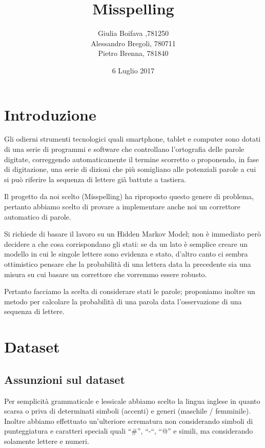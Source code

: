 \documentclass[a4paper,11pt]{article}
\title{Misspelling}
\author{Giulia Boifava ,781250\\
        Alessandro Bregoli, 780711\\
        Pietro Brenna, 781840}
\date{6 Luglio 2017}
\begin{document}
\maketitle
\newpage
\tableofcontents
\newpage

\section{Introduzione}
  Gli odierni strumenti tecnologici quali smartphone, tablet e computer sono dotati di una serie di programmi e software che controllano
  l’ortografia delle parole digitate, correggendo automaticamente il termine scorretto o proponendo, in fase di digitazione, una serie di
  dizioni che più somigliano alle potenziali parole a cui si può riferire la sequenza di lettere già battute a tastiera.
  
  Il progetto da noi scelto (Misspelling) ha riproposto questo genere di problema, pertanto abbiamo scelto di provare a implementare 
  anche noi un correttore automatico di parole.
  
  Si richiede di basare il lavoro su un Hidden Markov Model; non è immediato però decidere a che cosa corrispondano gli stati: se da un lato è 
  semplice creare un modello in cui le singole lettere sono evidenza e stato, d'altro canto ci sembra ottimistico pensare che la probabilità 
  di una lettera data la precedente sia una misura su cui basare un correttore che vorremmo essere robusto.
  
  Pertanto facciamo la scelta di considerare stati le parole; proponiamo inoltre un metodo per calcolare la probabilità di una parola data l'osservazione 
  di una sequenza di lettere.
\newpage
\section{Dataset}
  \subsection{Assunzioni sul dataset}
    Per semplicità grammaticale e lessicale abbiamo scelto la lingua inglese in quanto scarsa o priva di determinati simboli (accenti) e generi (maschile / 
    femminile).
    Inoltre abbiamo effettuato un’ulteriore scrematura non considerando simboli di punteggiatura e caratteri speciali quali “\#”, “-“, “@” e simili, ma 
    considerando solamente lettere e numeri.
\end{document}
